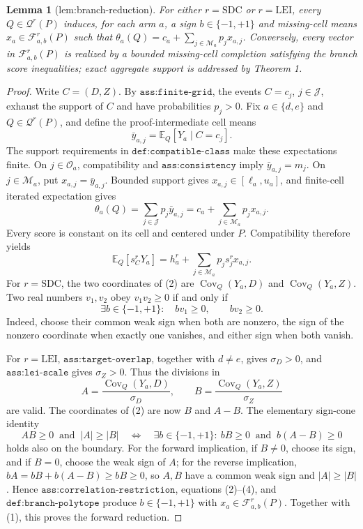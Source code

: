 \documentclass{article}
\newtheorem{lemma}{Lemma}
\begin{document}
\begin{lemma}[lem:branch-reduction]\label{lem:branch-reduction}
For either \(r=\mathrm{SDC}\) or \(r=\mathrm{LEI}\), every \(Q\in\mathcal Q^r(P)\) induces, for each arm \(a\), a sign \(b\in\{-1,+1\}\) and missing-cell means \(x_a\in\mathcal F_{a,b}^r(P)\) such that \(\theta_a(Q)=c_a+\sum_{j\in\mathcal M_a}p_jx_{a,j}\). Conversely, every vector in \(\mathcal F_{a,b}^r(P)\) is realized by a bounded missing-cell completion satisfying the branch score inequalities; exact aggregate support is addressed by Theorem 1.
\end{lemma}
\begin{proof}
Write \(C=(D,Z)\).  By \(\texttt{ass:finite-grid}\), the events \(C=c_j\), \(j\in\mathcal J\), exhaust the support of \(C\) and have probabilities \(p_j>0\).  Fix \(a\in\{d,e\}\) and \(Q\in\mathcal Q^r(P)\), and define the proof-intermediate cell means
\[
 \bar y_{a,j}=\mathbb E_Q[Y_a\mid C=c_j].
\]
The support requirements in \(\texttt{def:compatible-class}\) make these expectations finite.  On \(j\in\mathcal O_a\), compatibility and \(\texttt{ass:consistency}\) imply \(\bar y_{a,j}=m_j\).  On \(j\in\mathcal M_a\), put \(x_{a,j}=\bar y_{a,j}\).  Bounded support gives \(x_{a,j}\in[\ell_a,u_a]\), and finite-cell iterated expectation gives
\[
 \theta_a(Q)
 =\sum_{j\in\mathcal J}p_j\bar y_{a,j}
 =c_a+\sum_{j\in\mathcal M_a}p_jx_{a,j}.                                      \tag{1}
\]
Every score is constant on its cell and centered under \(P\).  Compatibility therefore yields
\[
 \mathbb E_Q[s_C^rY_a]
 =h_a^r+\sum_{j\in\mathcal M_a}p_js_j^rx_{a,j}.                               \tag{2}
\]
For \(r=\mathrm{SDC}\), the two coordinates of (2) are \(\operatorname{Cov}_Q(Y_a,D)\) and \(\operatorname{Cov}_Q(Y_a,Z)\).  Two real numbers \(v_1,v_2\) obey \(v_1v_2\ge0\) if and only if
\[
 \exists b\in\{-1,+1\}:\quad bv_1\ge0,\qquad bv_2\ge0.                       \tag{3}
\]
Indeed, choose their common weak sign when both are nonzero, the sign of the nonzero coordinate when exactly one vanishes, and either sign when both vanish.

For \(r=\mathrm{LEI}\), \(\texttt{ass:target-overlap}\), together with \(d\ne e\), gives \(\sigma_D>0\), and \(\texttt{ass:lei-scale}\) gives \(\sigma_Z>0\).  Thus the divisions in
\[
 A=\frac{\operatorname{Cov}_Q(Y_a,D)}{\sigma_D},
 \qquad
 B=\frac{\operatorname{Cov}_Q(Y_a,Z)}{\sigma_Z}
\]
are valid.  The coordinates of (2) are now \(B\) and \(A-B\).  The elementary sign-cone identity
\[
 AB\ge0\ \text{ and }\ |A|\ge|B|
 \quad\Longleftrightarrow\quad
 \exists b\in\{-1,+1\}:\ bB\ge0\ \text{ and }\ b(A-B)\ge0                 \tag{4}
\]
holds also on the boundary.  For the forward implication, if \(B\ne0\), choose its sign, and if \(B=0\), choose the weak sign of \(A\); for the reverse implication, \(bA=bB+b(A-B)\ge bB\ge0\), so \(A,B\) have a common weak sign and \(|A|\ge|B|\).  Hence \(\texttt{ass:correlation-restriction}\), equations (2)--(4), and \(\texttt{def:branch-polytope}\) produce \(b\in\{-1,+1\}\) with \(x_a\in\mathcal F_{a,b}^r(P)\).  Together with (1), this proves the forward reduction.


\end{proof}
\end{document}
